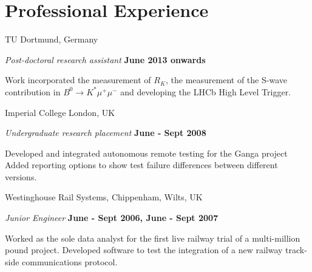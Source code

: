 \documentclass[10pt]{article}
\renewenvironment{compactitem}{
  \begin{list}{}{
    \setlength{\leftmargin}{1.5em}
  }
}{
  \end{list}
}
\begin{document}
\section*{Professional Experience}
TU Dortmund, Germany
\begin{compactitem}
\item \textit{Post-doctoral research assistant}%
        \hfill \textbf{June 2013 onwards}
\begin{compactitem}
\item Work incorporated the measurement of $R_K$, the measurement of the S-wave contribution in 
$B^0 \rightarrow K^{*}\mu^{+}\mu^{-}$ and developing the LHCb High Level Trigger.
\end{compactitem}
\end{compactitem}

Imperial College London, UK
\begin{compactitem}
\item \textit{Undergraduate research placement}%
        \hfill \textbf{June - Sept 2008}
\begin{compactitem}
\item Developed and integrated autonomous remote testing for the Ganga project  
Added reporting options to show test failure differences between different versions.
\end{compactitem}
\end{compactitem}

Westinghouse Rail Systems, Chippenham, Wilts, UK
\begin{compactitem}
\item \textit{Junior Engineer}%
        \hfill \textbf{June - Sept 2006, June - Sept 2007}
\begin{compactitem}
\item Worked as the sole data analyst for the first live railway trial of a multi-million pound project. Developed software to test the integration of a new railway track-side communications protocol. %
\end{compactitem}
\end{compactitem}
\end{document}
